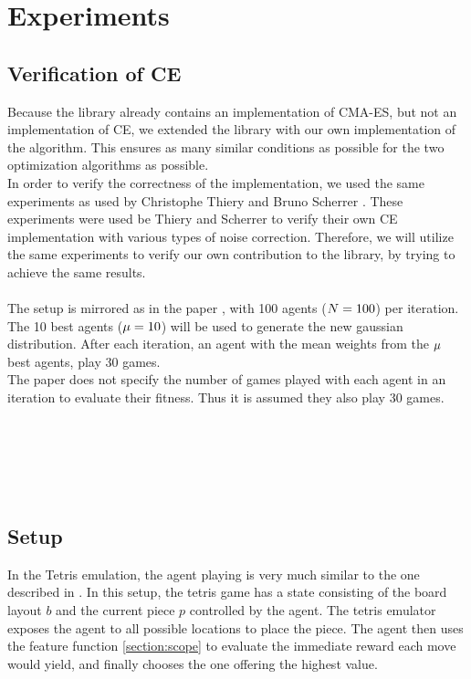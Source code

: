 \section{Experiments}


\subsection{Verification of CE}
Because the \shark library already contains an implementation of 
CMA-ES, but not an implementation of CE, we extended the library 
with our own implementation of the algorithm. 
This ensures as many similar conditions as possible for 
the two optimization algorithms as possible.\\
In order to verify the correctness of the implementation, 
we used the same experiments as used by 
Christophe Thiery and Bruno Scherrer \citep{thiery:09}. 
These experiments were used be Thiery and Scherrer to 
verify their own CE implementation with various types of noise correction. 
Therefore, we will utilize the same experiments to verify our 
own contribution to the \shark library, by trying to achieve the same results.\\
\\
The setup is mirrored as in the paper \citep{thiery:09}, 
with 100 agents ($N = 100$) per iteration. 
The 10 best agents ($\mu = 10$) will be used 
to generate the new gaussian distribution. After each iteration, 
an agent with the mean weights from the $\mu$ best agents, 
play 30 games.\\
The paper does not specify the number of games 
played with each agent in an iteration to evaluate their fitness. 
Thus it is assumed they also play 30 games.\\
\\
\\
\\
\\
\\

\subsection{Setup}

In the Tetris emulation, the agent playing is 
very much similar to the one described in \citep{scherrer2015}.
In this setup, the tetris game has a state consisting of the 
board layout $b$ and the current piece $p$ controlled by the agent.
The tetris emulator \cite{mdptetris} exposes the agent to all 
possible locations to place the piece. The agent then uses the 
feature function \ref{section:scope} to evaluate the immediate
reward each move would yield, and finally chooses the one offering 
the highest value.

